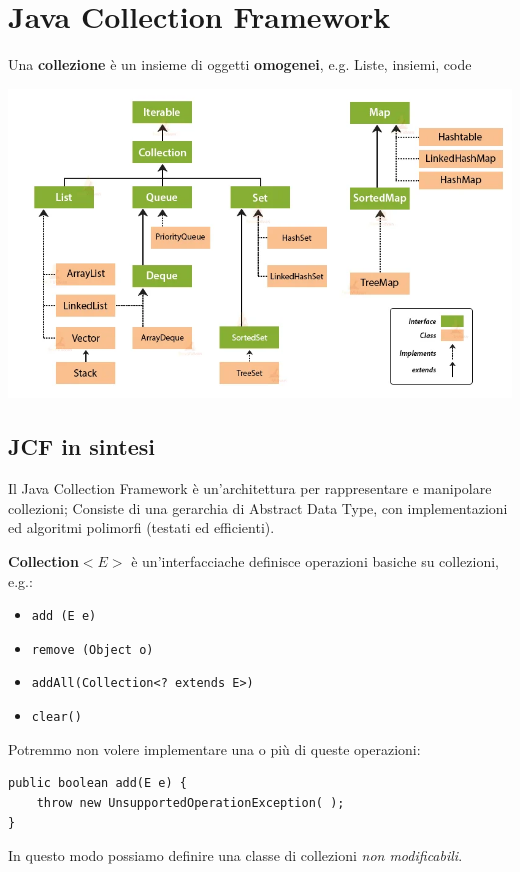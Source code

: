 \documentclass[a4paper,10pt]{article}
\begin{document}
\section{Java Collection Framework}
Una \textbf{collezione} è un insieme di oggetti \textbf{omogenei}, e.g. Liste, insiemi, code
\begin{center}
 
\includegraphics[scale = .5]{col}

\end{center}
\subsection{JCF in sintesi}
Il Java Collection Framework è un'architettura per rappresentare e manipolare collezioni; Consiste di una gerarchia di Abstract Data Type, con implementazioni ed algoritmi polimorfi (testati ed efficienti).\smallskip

\textbf{Collection$<E>$} è un'interfacciache definisce operazioni basiche su collezioni, e.g.:

\begin{itemize}
 \item \texttt{add (E e)}
 \item \texttt{remove (Object o)}
 \item \texttt{addAll(Collection<? extends E>)}
 \item \texttt{clear()}
  
\end{itemize}

Potremmo non volere implementare una o più di queste operazioni:
\begin{lstlisting} 
public boolean add(E e) {
    throw new UnsupportedOperationException( );
}
\end{lstlisting}
In questo modo possiamo definire una classe di collezioni \emph{non modificabili}.
\end{document}
